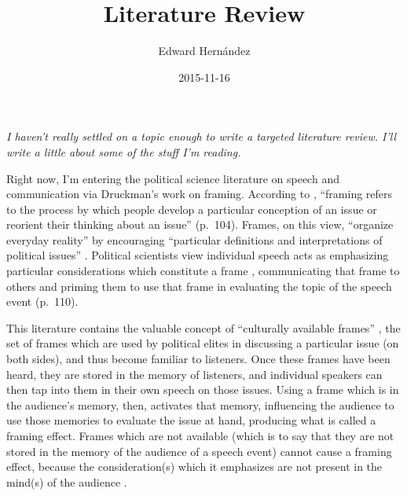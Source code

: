\documentclass[man,12pt,natbib]{apa6}
\begin{document}
\title{Literature Review}
\author{Edward Hern\'{a}ndez}
\date{2015-11-16}
\maketitle

\noindent
\emph{
I haven't really settled on a topic enough to write a targeted literature
review. I'll write a little about some of the stuff I'm reading.
}

\vspace{12pt}

Right now, I'm entering the political science literature on speech and
communication via Druckman's work on framing. According to \citet{Chong07},
``framing refers to the process by which people develop a particular conception
of an issue or reorient their thinking about an issue'' (p.~104). Frames, on
this view, ``organize everyday reality'' \citep[p.~193]{Tuchman78} by
encouraging ``particular definitions and interpretations of political issues''
\citep[p.~343]{Shah02}. Political scientists view individual speech acts as
emphasizing particular considerations which constitute a frame
\citep[p~106]{Chong07}, communicating that frame to others and priming them to
use that frame in evaluating the topic of the speech event (p.~110).

This literature contains the valuable concept of ``culturally available
frames'' \citep[p.~144]{Gamson87}, the set of frames which are used by political
elites in discussing a particular issue (on both sides), and thus become
familiar to listeners. Once these frames have been heard, they are stored in
the memory of listeners, and individual speakers can then tap into them in
their own speech on those issues.
%
%
Using a frame which is in the audience's memory, then, activates that memory,
influencing the audience to use those memories to evaluate the issue at hand,
producing what is called a framing effect. Frames which are not available
(which is to say that they are not stored in the memory of the audience of a
speech event) cannot cause a framing effect, because the consideration(s) which
it emphasizes are not present in the mind(s) of the audience
\citep[p.~110]{Chong07}.
\end{document}

